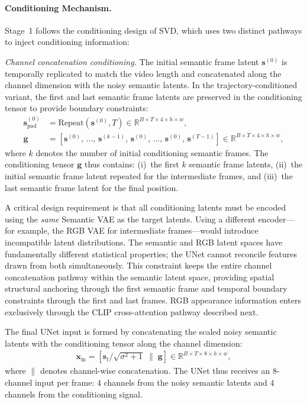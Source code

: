 \paragraph{Conditioning Mechanism.}
Stage~1 follows the conditioning design of SVD, which uses two distinct pathways to inject conditioning information:

\textit{Channel concatenation conditioning.} The initial semantic frame latent $\mathbf{s}^{(0)}$ is temporally replicated to match the video length and concatenated along the channel dimension with the noisy semantic latents. In the trajectory-conditioned variant, the first and last semantic frame latents are preserved in the conditioning tensor to provide boundary constraints:
\begin{align}
    \mathbf{s}^{(0)}_{\text{pad}} &= \text{Repeat}(\mathbf{s}^{(0)}, T) \in \mathbb{R}^{B \times T \times 4 \times h \times w}, \label{eq:frame_padding} \\
    \mathbf{g} &= \left[\mathbf{s}^{(0)},\, \ldots,\, \mathbf{s}^{(k-1)},\, \mathbf{s}^{(0)},\, \ldots,\, \mathbf{s}^{(0)},\, \mathbf{s}^{(T-1)}\right] \in \mathbb{R}^{B \times T \times 4 \times h \times w}, \label{eq:cond_latents_stage1}
\end{align}
where $k$ denotes the number of initial conditioning semantic frames. The conditioning tensor $\mathbf{g}$ thus contains: (i)~the first $k$ semantic frame latents, (ii)~the initial semantic frame latent repeated for the intermediate frames, and (iii)~the last semantic frame latent for the final position.

A critical design requirement is that all conditioning latents must be encoded using the \emph{same} Semantic VAE as the target latents. Using a different encoder---for example, the RGB VAE for intermediate frames---would introduce incompatible latent distributions. The semantic and RGB latent spaces have fundamentally different statistical properties; the UNet cannot reconcile features drawn from both simultaneously. This constraint keeps the entire channel concatenation pathway within the semantic latent space, providing spatial structural anchoring through the first semantic frame and temporal boundary constraints through the first and last frames. RGB appearance information enters exclusively through the CLIP cross-attention pathway described next.

The final UNet input is formed by concatenating the scaled noisy semantic latents with the conditioning tensor along the channel dimension:
\begin{align}
    \mathbf{x}_{\text{in}} = \left[\hat{\mathbf{s}}_t / \sqrt{\sigma^2 + 1} \;\|\; \mathbf{g}\right] \in \mathbb{R}^{B \times T \times 8 \times h \times w},
    \label{eq:unet_input_stage1}
\end{align}
where $\|$ denotes channel-wise concatenation. The UNet thus receives an 8-channel input per frame: 4 channels from the noisy semantic latents and 4 channels from the conditioning signal.

